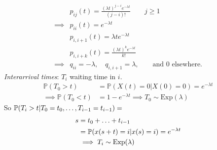 \documentclass{article}
\begin{document}
\begin{example}
    \begin{align*}
    &p_{ij}(t)=\frac{(\lambda t)^{j-i}e^{-\lambda t}}{(j-i)!}\qquad j\geqslant 1\\
    \implies &p_{ii}(t)=e^{-\lambda t}\\
    &p_{i,i+1}(t)=\lambda t e^{-\lambda t}\\
    &p_{i,i+k}(t)=\frac{(\lambda t)^{k}e^{-\lambda t}}{k!}\\
    \implies &q_{ii}=-\lambda,\quad q_{i,i+1}=\lambda,\qquad\text{and 0 elsewhere.}
\end{align*}
\textit{Interarrival times}: $T_i$ waiting time in $i$.
\begin{align*}
    \mathbb{P}(T_0 > t) &= \mathbb{P}(X(t) = 0|X(0) = 0) = e^{- \lambda t}\\
   \implies \mathbb{P}(T_0 < t) &= 1-e^{-\lambda t} \implies T_0 \sim \text{Exp}(\lambda)
\end{align*}
So $\mathbb{P}(T_i>t|T_0=t_0,\ldots,T_{i-1}=t_{i-1})=$
\begin{align*}
    s &= t_0+\ldots+t_{i-1}\\
    &=\mathbb{P}(x(s+t)=i|x(s)=i)=e^{-\lambda t}\\
    &\implies T_i\sim\text{Exp}(\lambda)
\end{align*}
\end{example}
\end{document}
